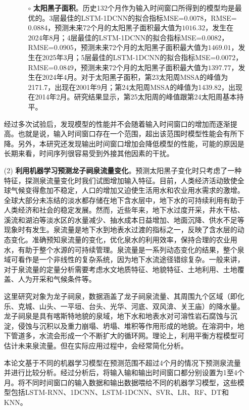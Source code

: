 \begin{enumerate}
\begin{itemize}
\begin{itemize}
      \item[$\circ$] \textbf{太阳黑子面积}。历史132个月作为输入时间窗口所得到的模型均是最优的。3层最佳的LSTM-1DCNN的拟合指标MSE=$0.0078$，RMSE=$0.0884$，预测未来72个月的太阳黑子面积最大值为$1016.32$，发生在2024年8月；4层最佳的LSTM-1DCNN的拟合指标MSE=$0.0082$，RMSE=$0.0905$，预测未来72个月的太阳黑子面积最大值为$1469.01$，发生在2025年3月；5层最佳的LSTM-1DCNN的拟合指标MSE=$0.0072$，RMSE=$0.0849$，预测未来72个月的太阳黑子面积最大值为$1397.77$，发生在2024年4月。对于太阳黑子面积，第23太阳周MSSA的峰值为2171.7，出现在2001年9月；第24太阳周MSSA的峰值为1439.82，出现在2014年2月。研究结果显示，第25太阳周的峰值跟第24太阳周基本持平。 
    \end{itemize}
  \end{itemize}
  经过多次试验后，发现模型的性能并不会随着输入时间窗口的增加而逐渐提高。也就是说，输入时间窗口存在一个范围，超出该范围时模型性能会有所下降。另外，本研究还发现输出时间窗口增加会降低模型的性能，可能的原因是长期来看，时间序列很容易受到外接其他因素的干扰。

  \item[(2)] \textbf{利用机器学习预测龙子祠泉流量变化}。预测太阳黑子变化时只考虑了一种特征，探测泉流量变化时我们试图增加输入特征。目前，人类经济活动致使全球气候变得愈加不稳定，人口的增加又迫使生活用水和农业用水需求的激增。全球大部分未冻结的淡水都存储在地下含水层中，地下水的可持续利用有助于人类经济和社会的稳定发展。然而，近些年来，地下水过度开采，井水干枯、溪流和湖泊等淡水区的水量减少、抽水成本日益增加、地面沉降、供水不足等现象时有发生。泉流量是地下水到地表水过渡的指标之一，反映了含水层的动态变化。准确预知泉流量的变化，优化泉水的利用效率，保持合理的农业用水，有助于整个水源的可持续管理。泉流量是一系列动态变化的结果，整个泉域可看作是一个非线性的复杂系统，因为地下水流途径错综复杂。一般来讲，对于泉流量的定量分析需要考虑水文地质特征、地貌特征、土地利用、土地覆盖、人为开采和气候条件等。
  
  这里研究对象为龙子祠泉，数据涵盖了龙子祠泉流量、其周围九个区域（即化乐、克城、山头、一平垣、台头、光华、河底、双风渰、关王庙）的降水量。龙子祠泉是具有喀斯特地貌的泉域，地下水和地表水对可溶性岩石腐蚀与沉淀，侵蚀与沉积以及重力崩塌、坍塌、堆积等作用形成的地貌。在溶洞中，地下管道多，水流会形成一个不断扩大的循环网。理论上，利用平衡方程模型可估计未来泉流量。但在实际应用过程中，会经常简化分析。
      
  本论文基于不同的机器学习模型在预测范围不超过4个月的情况下预测泉流量并进行比较分析。经过分析后，将输入输和输出时间窗口都分别设置为1至4个月。将不同时间窗口的输入数据和输出数据喂给不同的机器学习模型，这些模型包括LSTM-RNN、1DCNN、LSTM-1DCNN、SVR、LR、RF、DT和KNN。
  

\end{enumerate}
